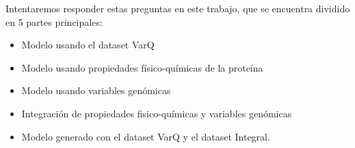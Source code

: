 Intentaremos responder estas preguntas en este trabajo, que se encuentra dividido en 5 partes principales:

\begin{itemize}
    \item Modelo usando el dataset VarQ
    \item Modelo usando propiedades físico-químicas de la proteína
    \item Modelo usando variables genómicas
    \item Integración de propiedades fisico-químicas y variables genómicas
    \item Modelo generado con el dataset VarQ y el dataset Integral.
\end{itemize}


